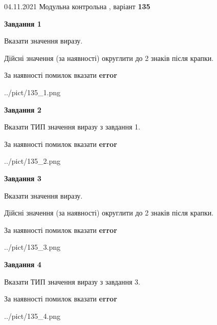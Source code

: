 \documentclass[11pt, ukrainian]{article}
\begin{document}
{04.11.2021 Модульна контрольна , варіант  \No \textbf { 135 }\par}
{
\begin {large}
{\begin {center}\textbf{Завдання 1}\end {center}}\par
Вказати значення виразу. \par
Дійсні значення (за наявності) округлити до 2 знаків після крапки. \par
За наявності помилок вказати \textbf{error}

\begin{center}
	{../pict/135_1.png}
\end{center}
\newpage

{\begin {center}\textbf{Завдання 2}\end {center}}\par
Вказати ТИП значення виразу з завдання 1. \par
За наявності помилок вказати \textbf{error}

\begin{center}
	{../pict/135_2.png}
\end{center}
\newpage

{\begin {center}\textbf{Завдання 3}\end {center}}\par
Вказати значення виразу. \par
Дійсні значення (за наявності) округлити до 2 знаків після крапки. \par
За наявності помилок вказати \textbf{error}

\begin{center}
	{../pict/135_3.png}
\end{center}
\newpage

{\begin {center}\textbf{Завдання 4}\end {center}}\par
Вказати ТИП значення виразу з завдання 3. \par
За наявності помилок вказати \textbf{error}

\begin{center}
	{../pict/135_4.png}
\end{center}
\newpage


\end{large}}
\end{document}
